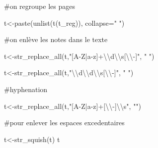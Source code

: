 \documentclass[
  letterpaper,
  DIV=11,
  numbers=noendperiod]{scrreprt}
\newenvironment{Shaded}{\begin{snugshade}}{\end{snugshade}}
\newcommand{\AttributeTok}[1]{\textcolor[rgb]{0.40,0.45,0.13}{#1}}
\newcommand{\CommentTok}[1]{\textcolor[rgb]{0.37,0.37,0.37}{#1}}
\newcommand{\FunctionTok}[1]{\textcolor[rgb]{0.28,0.35,0.67}{#1}}
\newcommand{\NormalTok}[1]{\textcolor[rgb]{0.00,0.23,0.31}{#1}}
\newcommand{\OtherTok}[1]{\textcolor[rgb]{0.00,0.23,0.31}{#1}}
\newcommand{\SpecialCharTok}[1]{\textcolor[rgb]{0.37,0.37,0.37}{#1}}
\newcommand{\StringTok}[1]{\textcolor[rgb]{0.13,0.47,0.30}{#1}}
\begin{document}
\begin{Shaded}
\begin{Highlighting}[]
\CommentTok{\#on regroupe les pages}

\NormalTok{t}\OtherTok{\textless{}{-}}\FunctionTok{paste}\NormalTok{(}\FunctionTok{unlist}\NormalTok{(}\FunctionTok{t}\NormalTok{(t\_reg)), }\AttributeTok{collapse=}\StringTok{" "}\NormalTok{)}



\CommentTok{\#on enlève les notes dans le texte}

\NormalTok{t}\OtherTok{\textless{}{-}}\FunctionTok{str\_replace\_all}\NormalTok{(t,}\StringTok{"[A{-}Z|a{-}z]+}\SpecialCharTok{\textbackslash{}\textbackslash{}}\StringTok{d}\SpecialCharTok{\textbackslash{}\textbackslash{}}\StringTok{s[}\SpecialCharTok{\textbackslash{}\textbackslash{}}\StringTok{{-}]"}\NormalTok{, }\StringTok{" "}\NormalTok{)}

\NormalTok{t}\OtherTok{\textless{}{-}}\FunctionTok{str\_replace\_all}\NormalTok{(t,}\StringTok{"}\SpecialCharTok{\textbackslash{}\textbackslash{}}\StringTok{d}\SpecialCharTok{\textbackslash{}\textbackslash{}}\StringTok{d}\SpecialCharTok{\textbackslash{}\textbackslash{}}\StringTok{s[}\SpecialCharTok{\textbackslash{}\textbackslash{}}\StringTok{{-}]"}\NormalTok{, }\StringTok{" "}\NormalTok{)}

\CommentTok{\#hyphenation}

\NormalTok{t}\OtherTok{\textless{}{-}}\FunctionTok{str\_replace\_all}\NormalTok{(t,}\StringTok{"[A{-}Z|a{-}z]+[}\SpecialCharTok{\textbackslash{}\textbackslash{}}\StringTok{{-}]}\SpecialCharTok{\textbackslash{}\textbackslash{}}\StringTok{s"}\NormalTok{, }\StringTok{""}\NormalTok{)}

\CommentTok{\#pour enlever les espaces excedentaires}

\NormalTok{t}\OtherTok{\textless{}{-}}\FunctionTok{str\_squish}\NormalTok{(t)}
\NormalTok{t}
\end{Highlighting}
\end{Shaded}
\end{document}
